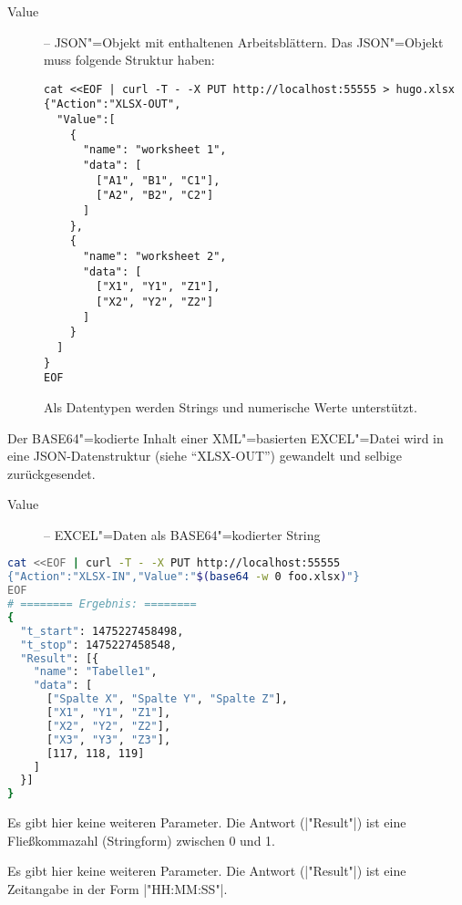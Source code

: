 \documentclass[titlepage=false,toc=nobibliography]{vl-report}
\newcommand*\action[1]{\fbox{\nolinkurl{#1}}\medskip\par}
\begin{document}
\begin{description}
\begin{description}
      \begin{description}

        \item[Value] -- JSON"=Objekt mit enthaltenen Arbeitsblättern. Das
        JSON"=Objekt muss folgende Struktur haben:
\begin{lstlisting}[language={}]
cat <<EOF | curl -T - -X PUT http://localhost:55555 > hugo.xlsx
{"Action":"XLSX-OUT",
  "Value":[
    {
      "name": "worksheet 1",
      "data": [
        ["A1", "B1", "C1"],
        ["A2", "B2", "C2"]
      ]
    }, 
    {
      "name": "worksheet 2",
      "data": [
        ["X1", "Y1", "Z1"],
        ["X2", "Y2", "Z2"]
      ]
    }
  ]
}
EOF
\end{lstlisting}
      Als Datentypen werden Strings und numerische Werte unterstützt.
      \end{description}

    \item \action{XLSX-IN}

      \noindent Der BASE64"=kodierte Inhalt einer XML"=basierten EXCEL"=Datei
      wird in eine JSON-Datenstruktur (siehe "`XLSX-OUT"') gewandelt und
      selbige zurückgesendet.

      \begin{description}

        \item[Value] -- EXCEL"=Daten als BASE64"=kodierter String

      \end{description}
\begin{lstlisting}[language=bash]
cat <<EOF | curl -T - -X PUT http://localhost:55555
{"Action":"XLSX-IN","Value":"$(base64 -w 0 foo.xlsx)"}
EOF
# ======== Ergebnis: ========
{
  "t_start": 1475227458498,
  "t_stop": 1475227458548,
  "Result": [{
    "name": "Tabelle1",
    "data": [
      ["Spalte X", "Spalte Y", "Spalte Z"],
      ["X1", "Y1", "Z1"],
      ["X2", "Y2", "Z2"],
      ["X3", "Y3", "Z3"],
      [117, 118, 119]
    ]
  }]
}
\end{lstlisting}

    \item \action{RANDOM}

      \noindent Es gibt hier keine weiteren Parameter. Die Antwort
      (|"Result"|) ist eine Fließkommazahl (Stringform) zwischen 0 und 1.

    \item \action{TIME}

      \noindent Es gibt hier keine weiteren Parameter. Die Antwort
      (|"Result"|) ist eine Zeitangabe in der Form |"HH:MM:SS"|.


\end{description}
\end{description}
\end{document}
